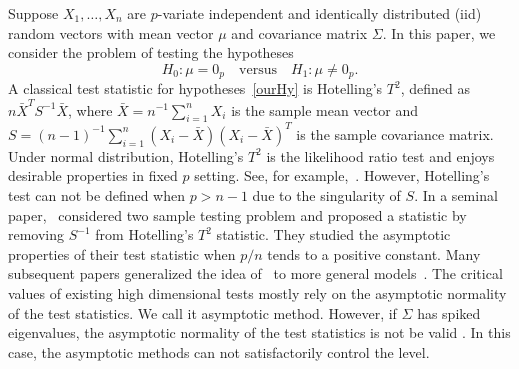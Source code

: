 \documentclass[3p]{elsarticle}
\newcommand{\BP}{\mathbf{P}}
\theoremstyle{plain}
\theoremstyle{definition}
\theoremstyle{remark}
\begin{document}
Suppose $X_{1},\ldots,X_{n}$ are $p$-variate independent and identically distributed (iid) random vectors with mean vector $\mu$ and covariance matrix $\Sigma$. In this paper, we consider the problem of testing the hypotheses
\begin{equation}\label{ourHy}
    H_0:\mu=0_p\quad \textrm{versus} \quad H_1:\mu\neq 0_p.
\end{equation}
A classical test statistic for hypotheses~\eqref{ourHy} is Hotelling's $T^2$, defined as
    $
    n\bar{X}^T S^{-1}\bar{X}
    $,
where $\bar{X}=n^{-1}\sum_{i=1}^n X_i$ is the sample mean vector and $S=(n-1)^{-1}\sum_{i=1}^n (X_i-\bar{X}) (X_i-\bar{X})^T$ is the sample covariance matrix.
Under normal distribution, Hotelling's $T^2$ is the likelihood ratio test and enjoys desirable properties in fixed $p$ setting. See, for example,~\citet{andersonMultivariate}.
However, Hotelling's test can not be defined when $p>n-1$ due to the singularity of $S$.
In a seminal paper,~\citet{Bai1996Efiect} considered two sample testing problem and proposed a statistic by removing $S^{-1}$ from Hotelling's $T^2$ statistic.
They studied the asymptotic properties of their test statistic when $p/n$ tends to a positive constant.
Many subsequent papers generalized the idea of~\citet{Bai1996Efiect} to more general models~\citep{Srivastava2008A,Chen2010A,Wang2015A}.
The critical values of existing high dimensional tests mostly rely on the asymptotic normality of the test statistics. 
We call it asymptotic method.
  However, if $\Sigma$ has spiked eigenvalues, the asymptotic normality of the test statistics is not be valid \citep{KATAYAMA2013410}.
  In this case, the asymptotic methods can not satisfactorily control the level.
\end{document}
